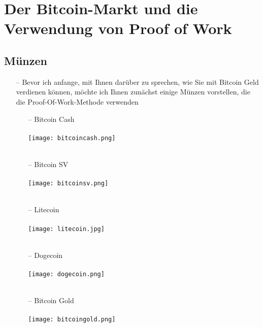 \documentclass[ngerman]{scrreprt}
\begin{document}
\chapter{Der Bitcoin-Markt und die Verwendung von Proof of Work}
\section{Münzen}

\begin{itemize}
	\item[--] Bevor ich anfange, mit Ihnen darüber zu sprechen, wie Sie mit Bitcoin Geld verdienen können, möchte ich Ihnen zunächst einige Münzen vorstellen, die die Proof-Of-Work-Methode verwenden
	\begin{itemize}
		\item [--] {Bitcoin Cash} \\ \\ 
		\texttt{[image: bitcoincash.png]}\\ \\
		
		\item [--] {Bitcoin SV} \\ \\
		\texttt{[image: bitcoinsv.png]}\\ \\
		\item [--] {Litecoin} \\ \\ 
		\texttt{[image: litecoin.jpg]} \\ \\
		\item [--] {Dogecoin} \\ \\
		\texttt{[image: dogecoin.png]}\\ \\
		\item [--] {Bitcoin Gold}\\ \\
		\texttt{[image: bitcoingold.png]}\\ \\



	\end{itemize}
	

\end{itemize}
\end{document}
